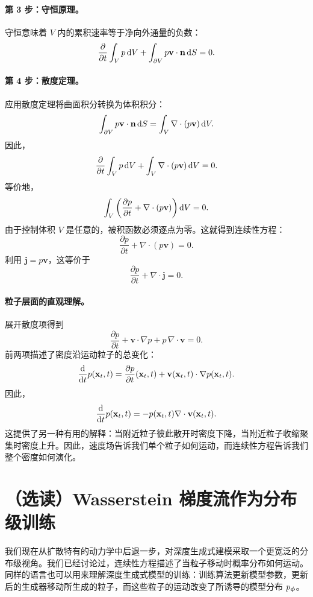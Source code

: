 \paragraph{第 3 步：守恒原理。}  
守恒意味着 $V$ 内的累积速率等于净向外通量的负数：
\[
\frac{\partial}{\partial t} \int_V p \mathop{}\!\mathrm{d} V + \int_{\partial V} p \mathbf{v} \cdot \mathbf{n} \mathop{}\!\mathrm{d} S = 0.
\]

\paragraph{第 4 步：散度定理。}  
应用散度定理将曲面积分转换为体积积分：
\[
\int_{\partial V} p \mathbf{v} \cdot \mathbf{n} \mathop{}\!\mathrm{d} S = \int_V \nabla \cdot (p \mathbf{v}) \mathop{}\!\mathrm{d} V.
\]
因此，
\[
\frac{\partial}{\partial t} \int_V p \mathop{}\!\mathrm{d} V + \int_V \nabla \cdot (p \mathbf{v}) \mathop{}\!\mathrm{d} V = 0.
\]
等价地，
\[
\int_V \left(\frac{\partial p}{\partial t}+\nabla\cdot(p\mathbf{v})\right)\mathop{}\!\mathrm{d} V=0.
\]
由于控制体积 $V$ 是任意的，被积函数必须逐点为零。这就得到连续性方程：
\[
\frac{\partial p}{\partial t}+\nabla\cdot(p\mathbf{v})=0.
\]
利用 $\mathbf{j}=p\mathbf{v}$，这等价于
\[
\frac{\partial p}{\partial t}+\nabla\cdot\mathbf{j}=0.
\]

\paragraph{粒子层面的直观理解。}
展开散度项得到
\[
\frac{\partial p}{\partial t}
+
\mathbf{v}\cdot\nabla p
+
p\,\nabla\cdot\mathbf{v}
=
0.
\]
前两项描述了密度沿运动粒子的总变化：
\[
\frac{\mathop{}\!\mathrm{d}}{\mathop{}\!\mathrm{d} t}p(\mathbf{x}_t,t)
=
\frac{\partial p}{\partial t}(\mathbf{x}_t,t)
+
\mathbf{v}(\mathbf{x}_t,t)\cdot\nabla p(\mathbf{x}_t,t).
\]
因此，
\[
\frac{\mathop{}\!\mathrm{d}}{\mathop{}\!\mathrm{d} t}p(\mathbf{x}_t,t)
=
-
p(\mathbf{x}_t,t)\nabla\cdot\mathbf{v}(\mathbf{x}_t,t).
\]
这提供了另一种有用的解释：当附近粒子彼此散开时密度下降，当附近粒子收缩聚集时密度上升。因此，速度场告诉我们单个粒子如何运动，而连续性方程告诉我们整个密度如何演化。

\clearpage
\newpage

\section{（选读）Wasserstein 梯度流作为分布级训练}
\label{sec:wgf-distribution-level-training}

我们现在从扩散特有的动力学中后退一步，对深度生成式建模采取一个更宽泛的分布级视角。我们已经讨论过，连续性方程描述了当粒子移动时概率分布如何运动。同样的语言也可以用来理解深度生成式模型的训练：训练算法更新模型参数，更新后的生成器移动所生成的粒子，而这些粒子的运动改变了所诱导的模型分布 $p_{{\bm{\phi}}}$。

